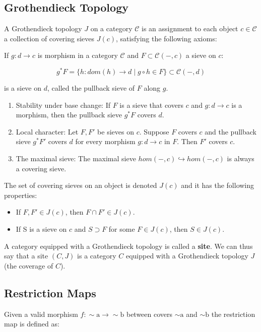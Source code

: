 \documentclass[11pt]{article}
\begin{document}
\subsection{Grothendieck Topology}
A Grothendieck topology $J$ on a category $\mathcal{C}$ is an assignment to each object $c \in \mathcal{C}$ a collection of covering sieves $J(c)$,
satisfying the following axioms:

If $g: d \to c$ is morphism in a category $\mathcal{C}$ and $F \subset \mathcal{C}(-, c)$ a sieve on $c$:

\[
    g^*F = \{ h: dom(h) \to d \mid g \circ h \in F \} \subset \mathcal{C}(-, d)
\]

is a sieve on $d$, called the pullback sieve of $F$ along $g$.

\begin{enumerate}
    \item Stability under base change: If $F$ is a sieve that covers $c$ and $g: d \to c$ is a morphism, then the pullback sieve $g^*F$ covers $d$.
    \item Local character: Let $F, F'$ be sieves on $c$. Suppose $F$ covers $c$ and the pullback sieve $g^*F'$ covers $d$ for every morphism $g: d \to c$ in $F$. Then $F'$ covers $c$.
    \item The maximal sieve: The maximal sieve $hom(-, c) \hookrightarrow hom(-, c)$ is always a covering sieve.
\end{enumerate}

The set of covering sieves on an object is denoted $J(c)$ and it has the following properties:
\begin{itemize}
    \item If $F, F' \in J(c)$, then $F \cap F' \in J(c)$.
    \item If S is a sieve on $c$ and $S \supset F$ for some $F \in J(c)$, then $S \in J(c)$.
\end{itemize}

A category equipped with a Grothendieck topology is called a \textbf{site}. We can thus say that a site $(C, J)$ is a category $C$ equipped with a Grothendieck topology $J$ (the coverage of $C$).


\subsection{Restriction Maps}
Given a valid morphism $f : \sim\!\text{a} \to \sim\!\textrm{b}$ between covers $\sim\!\text{a}$ and $\sim\!\text{b}$ the restriction map is defined as:
\end{document}
